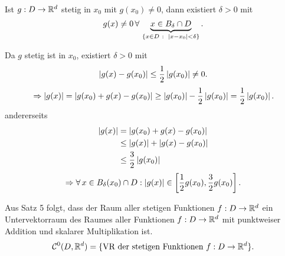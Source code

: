 \documentclass[../ana1.tex]{subfiles}
\begin{document}
\begin{lem}
    Ist \( g: D\rightarrow \mathbb{R}^d \) stetig in \( x_0 \) mit 
    \( g(x_0) \neq 0 \), dann existiert \( \delta > 0 \) mit 
    \[ g(x) \neq 0 \,\forall \, \underbrace{x\in B_\delta \cap D
    }_{ \{x\in D \;\colon \; \left|x-x_0\right| < \delta \} }. \]
\end{lem}
\begin{bew}
    Da \( g \) stetig ist in \( x_0 \), existiert \( \delta > 0 \) mit 
    \[ \left| g(x) - g(x_0) \right| \leq \frac{1}{2} \left|g(x_0)\right| \neq 0. \]
    \[ \Rightarrow \left| g(x) \right| = \left| g(x_0) + g(x) - g(x_0) \right| \geq 
    \left|g(x_0)\right| - \frac{1}{2} \left|g(x_0)\right| = \frac{1}{2} \left| g(x_0) \right|. \]
    andererseits 
    \begin{align*}
        \left|g(x)\right| &= \left| g(x_0) + g(x) - g(x_0) \right| \\
        &\leq \left|g(x)\right| + \left| g(x) - g(x_0) \right| \\
        &\leq \frac{3}{2} \left| g(x_0) \right|
    \end{align*}
    \[ \Rightarrow \forall \, x\in B_\delta(x_0) \cap D : 
    \left|g(x)\right| \in \left[ \frac{1}{2} g(x_0), \frac{3}{2} g(x_0) \right]. \]
\end{bew}
\begin{bem}
    Aus Satz 5 folgt, dass der Raum aller stetigen Funktionen 
    \( f: D\rightarrow \mathbb{R}^d \) ein Untervektorraum des Raumes
    aller Funktionen \( f: D \rightarrow \mathbb{R}^d \) mit punktweiser 
    Addition und skalarer Multiplikation ist.
    \[ \mathcal{C}^0 (D, \mathbb{R}^d) = \{ \text{VR der stetigen Funktionen } 
    f: D \rightarrow \mathbb{R}^d \}. \]
\end{bem}
\end{document}
